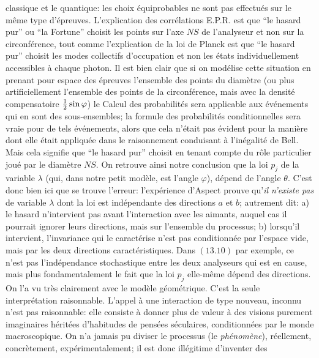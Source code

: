 classique et le quantique: les choix \'equiprobables ne sont pas 
effectu\'es sur le m\^eme type d'\'epreuves. L'explication des 
corr\'elations E.P.R. est que ``le hasard pur'' ou ``la Fortune'' choisit 
les points sur l'axe $NS$ de l'analyseur et non sur la circonf\'erence,  
tout comme l'explication de la loi de Planck est que ``le hasard pur'' 
choisit les modes collectifs d'occupation et non les \'etats 
individuellement accessibles \`a chaque photon.  Il est bien clair que 
si on mod\'elise cette situation en prenant pour espace des \'epreuves
l'ensemble des points du diam\`etre (ou plus artificiellement l'ensemble 
des points de la circonf\'erence, mais avec la densit\'e compensatoire 
${1\over 2} \sin\varphi$) le Calcul des probabilit\'es sera applicable  
aux \'ev\'enements qui en sont des sous-ensembles; la formule des 
probabilit\'es conditionnelles sera vraie pour de tels \'ev\'enements,
alors que cela n'\'etait pas \'evident pour la mani\`ere dont elle \'etait
appliqu\'ee dans le raisonnement conduisant \`a l'in\'egalit\'e de Bell. 
Mais cela signifie que ``le hasard pur'' choisit en tenant compte du
r\^ole particulier jou\'e par le diam\`etre $NS$.  On retrouve ainsi notre
conclusion que la loi $p_j$ de la variable $\lambda$ (qui,  dans notre
petit mod\`ele,  est l'angle $\varphi$),  d\'epend de l'angle $\theta$. 
\medskip 
C'est donc bien ici que se trouve l'erreur: l'exp\'erience d'Aspect prouve 
qu'{\it il n'existe pas} de variable $\lambda$ dont la loi est 
ind\'ependante des directions $a$ et $b$; autrement dit: 
\smallskip 
a) le hasard n'intervient pas avant l'interaction avec les aimants,  auquel
cas il pourrait ignorer leurs directions,  mais sur l'ensemble du processus;
\smallskip 
b) lorsqu'il intervient, l'invariance qui le caract\'erise n'est pas
conditionn\'ee par l'espace vide, mais par les deux directions caract\'eristiques. 
\medskip 
Dans $(13.10)$ par exemple, ce n'est pas l'ind\'ependance stochastique 
entre les deux analyseurs qui est en cause, mais plus fondamentalement le
fait que la loi $p_j$ elle-m\^eme d\'epend des directions.  On l'a vu tr\`es
clairement avec le mod\`ele g\'eom\'etrique. 
\medskip
C'est la seule interpr\'etation raisonnable.  L'appel \`a une {\og interaction
de type nouveau,  inconnu\fg} n'est pas raisonnable:  elle consiste \`a donner
plus de valeur \`a des visions purement imaginaires h\'erit\'ees d'habitudes
de pens\'ees s\'eculaires,  conditionn\'ees par le monde macroscopique. 
On n'a jamais pu diviser le processus (le {\it ph\'enom\`ene}),  r\'eellement, 
concr\`etement,  exp\'erimentalement;  il est donc ill\'egitime d'inventer des
